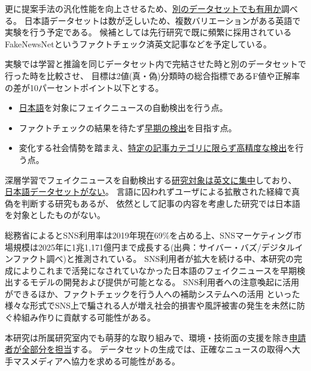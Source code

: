 更に提案手法の汎化性能を向上させるため、\underline{別のデータセットでも有用か}調べる。
日本語データセットは数が乏しいため、複数バリエーションがある英語で実験を行う予定である。
候補としては先行研究で既に頻繁に採用されているFakeNewsNet\cite{fakenewsnet}というファクトチェック済英文記事などを予定している。

実験では学習と推論を同じデータセット内で完結させた時と別のデータセットで行った時を比較させ、
目標は2値(真・偽)分類時の総合指標であるF値や正解率の差が10パーセントポイント以下とする。


\vspace{20pt}
\begin{itemize}
    \item \underline{日本語}を対象にフェイクニュースの自動検出を行う点。
    \item ファクトチェックの結果を待たず\underline{早期の検出}を目指す点。
    \item 変化する社会情勢を踏まえ、\underline{特定の記事カテゴリに限らず高精度な検出}を行う点。
\end{itemize}

深層学習でフェイクニュースを自動検出する\underline{研究対象は英文に集中}しており、
\underline{日本語データセットがない}。
言語に囚われずユーザによる拡散された経緯で真偽を判断する研究もあるが\cite{tarek2020}、
依然として記事の内容を考慮した研究では日本語を対象としたものがない。

総務省によるとSNS利用率は2019年現在69\%を占める上、SNSマーケティング市場規模は2025年に1兆1,171億円まで成長する(出典：サイバー・バズ/デジタルインファクト調べ)と推測されている。
SNS利用者が拡大を続ける中、本研究の完成によりこれまで活発になされていなかった日本語のフェイクニュースを早期検出するモデルの開発および提供が可能となる。
SNS利用者への注意喚起に活用ができるほか、ファクトチェックを行う人への補助システムへの活用
といった様々な形式でSNS上で騙される人が増え社会的損害や風評被害の発生を未然に防ぐ枠組み作りに貢献する可能性がある。


本研究は所属研究室内でも萌芽的な取り組みで、環境・技術面の支援を除き\underline{申請者が全部分を担当}する。
データセットの生成では、正確なニュースの取得へ大手マスメディアへ協力を求める可能性がある。

